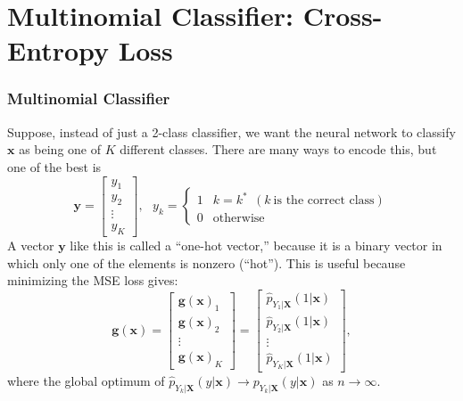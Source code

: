 \section[CE Loss]{Multinomial Classifier: Cross-Entropy  Loss}
\setcounter{subsection}{1}

\begin{frame}
  \frametitle{Multinomial Classifier}

  Suppose, instead of just a 2-class classifier, we want the neural
  network to classify $\mathbf{x}$ as being one of $K$ different classes.
  There are many ways to encode this, but one of the best is
  \begin{displaymath}
    \mathbf{y}=\left[\begin{array}{c}y_1\\y_2\\\vdots\\y_K\end{array}\right],~~~
    y_k=\begin{cases}1&k=k^*~~(k~\mbox{is the correct class})\\0&\mbox{otherwise}\end{cases}
  \end{displaymath}
  A vector $\mathbf{y}$ like this is called a ``one-hot vector,'' because
  it is a binary vector in which only one of the elements is nonzero (``hot'').
  This is useful  because minimizing the MSE loss gives:
  \begin{displaymath}
    \mathbf{g}(\mathbf{x})=\left[\begin{array}{c}\mathbf{g}(\mathbf{x})_1\\\mathbf{g}(\mathbf{x})_2\\\vdots\\\mathbf{g}(\mathbf{x})_K\end{array}\right]
    =\left[\begin{array}{c}
        \hat{p}_{Y_1|\mathbf{X}}(1|\mathbf{x})\\
        \hat{p}_{Y_2|\mathbf{X}}(1|\mathbf{x})\\
        \vdots\\
        \hat{p}_{Y_K|\mathbf{X}}(1|\mathbf{x})
        \end{array}\right],
  \end{displaymath}
  where the global optimum of
  $\hat{p}_{Y_k|\mathbf{X}}(y|\mathbf{x})\rightarrow
  p_{Y_k|\mathbf{X}}(y|\mathbf{x})$ as $n\rightarrow\infty$.
\end{frame}

